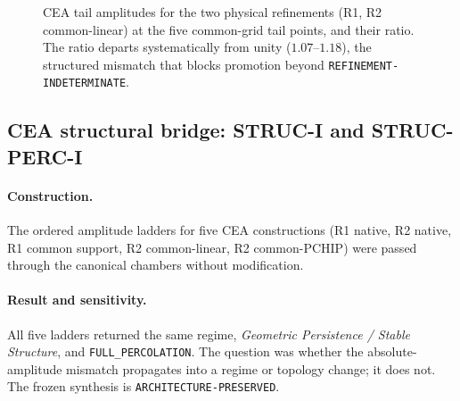 \documentclass[11pt,a4paper]{article}
\theoremstyle{definition}
\theoremstyle{remark}
\begin{document}
\begin{figure}[t]
\centering
{}
\caption{CEA tail amplitudes for the two physical refinements (R1, R2 common-linear) at the five common-grid tail points, and their ratio. The ratio departs systematically from unity ($1.07$--$1.18$), the structured mismatch that blocks promotion beyond \texttt{REFINEMENT-\allowbreak{}INDETERMINATE}.}\label{fig:cea}
\end{figure}

\subsection{CEA structural bridge: STRUC-I and STRUC-PERC-I}\label{ssec:ceastruc}
\paragraph{Construction.} The ordered amplitude ladders for five CEA constructions (R1 native, R2 native, R1 common support, R2 common-linear, R2 common-PCHIP) were passed through the canonical chambers without modification.
\paragraph{Result and sensitivity.} All five ladders returned the same regime, \emph{Geometric Persistence / Stable Structure}, and \texttt{FULL\_PERCOLATION}. The question was whether the absolute-amplitude mismatch propagates into a regime or topology change; it does not. The frozen synthesis is \texttt{ARCHITECTURE-\allowbreak{}PRESERVED}.
\end{document}
